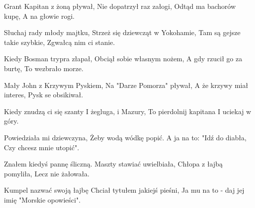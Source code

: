 \documentclass[../../../songbook.tex]{subfiles}
\begin{document}
\begin{multicols}{3}
{Grant Kapitan z żoną pływał, \newline
Nie dopatrzył raz załogi, \newline
Odtąd ma bachorów kupę, \newline
A na głowie rogi. \newline

Słuchaj rady młody majtku, \newline
Strzeż się dziewcząt w Yokohamie, \newline
Tam są gejsze takie szybkie, \newline
Zgwałcą nim ci stanie. \newline

Kiedy Bosman trypra złapał, \newline
Obciął sobie własnym nożem, \newline
A gdy rzucił go za burtę, \newline
To wezbrało morze. \newline

Mały John z Krzywym Pyskiem, \newline
Na "Darze Pomorza" pływał, \newline
A że krzywy miał interes, \newline
Pysk se obsikiwał. \newline

Kiedy znudzą ci się szanty \newline
I żegluga, i Mazury, \newline
To pierdolnij kapitana \newline
I uciekaj w góry. \newline

Powiedziała mi dziewczyna, \newline
Żeby wodą wódkę popić. \newline
A ja na to: "Idź do diabła, \newline
Czy chcesz mnie utopić". \newline

Znałem kiedyś pannę śliczną. \newline
Maszty stawiać uwielbiała, \newline
Chłopa z łajbą pomyliła, \newline
Lecz nie żałowała. \newline

Kumpel nazwać swoją łajbę \newline
Chciał tytułem jakiejś pieśni, \newline
Ja mu na to - daj jej imię \newline
"Morskie opowieści". \newline

}
\end{multicols}
\end{document}
